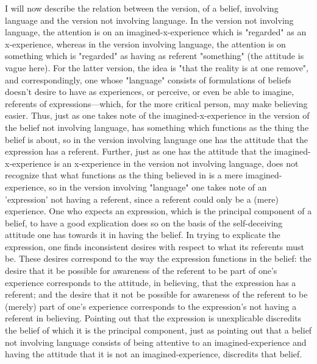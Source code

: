 \documentclass[10pt,twoside]{memoir}
\begin{document}
\begin{enumerate}
{ I will now describe the relation between the 
version, of a belief, involving language and the version not involving 
language. In the version not involving language, the attention is on an 
imagined-x-experience which is "regarded" as an x-experience, whereas in 
the version involving language, the attention is on something which is 
"regarded" as having as referent "something" (the attitude is vague here). 
For the latter version, the idea is "that the reality is at one remove", and 
correspondingly, one whose "language" consists of formulations of beliefs 
doesn't desire to have as experiences, or perceive, or even be able to imagine, 
referents of expressions---which, for the more critical person, may make 
believing easier. Thus, just as one takes note of the imagined-x-experience in 
the version of the belief not involving language, has something which 
functions as the thing the belief is about, so in the version involving language 
one has the attitude that the expression has a referent. Further, just as one 
has the attitude that the imagined-x-experience is an x-experience in the 
version not involving language, does not recognize that what functions as the 
thing believed in is a mere imagined-experience, so in the version involving 
"language" one takes note of an 'expression' not having a referent, since a 
referent could only be a (mere) experience. One who expects an expression, 
which is the principal component of a belief, to have a good explication does 
so on the basis of the self-deceiving attitude one has towards it in having the 
belief. In trying to explicate the expression, one finds inconsistent desires 
with respect to what its referents must be. These desires correspond to the 
way the expression functions in the belief: the desire that it be possible for 
awareness of the referent to be part of one's experience corresponds to the 
attitude, in believing, that the expression has a referent; and the desire that it 
not be possible for awareness of the referent to be (merely) part of one's 
experience corresponds to the expression's not having a referent in believing. 
Pointing out that the expression is unexplicable discredits the belief of which 
it is the principal component, just as pointing out that a belief not involving 
language consists of being attentive to an imagined-experience and having the 
attitude that it is not an imagined-experience, discredits that belief. 

}
\end{enumerate}
\end{document}
